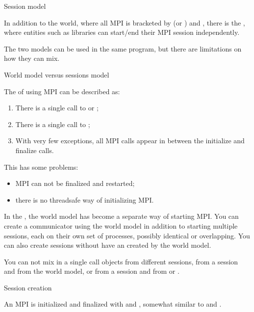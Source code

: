 \begin{mpifournote}{Session model}

In addition to the world,
where all MPI is bracketed by 
(or ) and ,
there is the ,
where entities such as libraries can start/end their MPI session
independently.

The two models can be used in the same program, but there are limitations
on how they can mix.

 {World model versus sessions model}

The  of using MPI can be described as:
\begin{enumerate}
\item There is a single call to  or ;
\item There is a single call to ;
\item With very few exceptions, all MPI calls appear in between the initialize and finalize calls.
\end{enumerate}

This has some problems:
\begin{itemize}
\item MPI can not be finalized and restarted;
\item there is no threadsafe way of initializing MPI.
\end{itemize}

In the ,
the world model has become a separate way of starting MPI.
You can create a communicator using the world model
in addition to starting multiple sessions,
each on
their own set of processes, possibly identical or overlapping.
You can also create sessions without have an 
created by the world model.

You can not mix in a single call objects
from different sessions,
from a session and from the world model,
or from a session and from 
or .

 {Session creation}

An MPI  is initialized and finalized
with  and ,
somewhat similar to  and .



\end{mpifournote}
